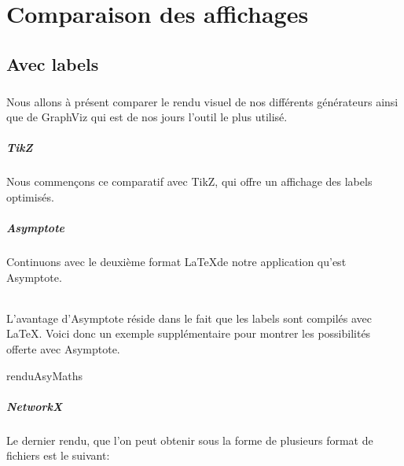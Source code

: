 \chapter{Comparaison des affichages}

	\section{Avec labels}
	
\paragraph{}Nous allons à présent comparer le rendu visuel de nos différents générateurs ainsi que de GraphViz qui est de nos jours l'outil le plus utilisé.

\paragraph{TikZ} Nous commençons ce comparatif avec TikZ, qui offre un affichage des labels optimisés.\\

\begin{center}
\resizebox {!}{6cm} {
}
\end{center}

\paragraph{Asymptote} Continuons avec le deuxième format \LaTeX de notre application qu'est Asymptote.\\

\begin{center}

\end{center}

\subparagraph{} L'avantage d'Asymptote réside dans le fait que les labels sont compilés avec \LaTeX. Voici donc un exemple supplémentaire pour montrer les possibilités offerte avec Asymptote.\\

\begin{center}
 {renduAsyMaths}
\end{center}

\paragraph{NetworkX} Le dernier rendu, que l'on peut obtenir sous la forme de plusieurs format de fichiers est le suivant:\\

